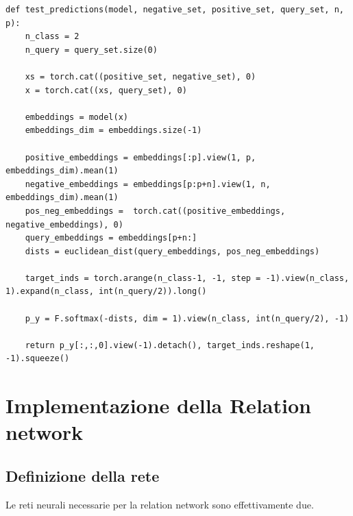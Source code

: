 \documentclass[12pt,a4paper,titlepage]{article}
\begin{document}
\begin{lstlisting}[language=iPython,firstnumber=11, caption=Funzione \texttt{test\_prediction}, label=test_predictions,captionpos=b]
def test_predictions(model, negative_set, positive_set, query_set, n, p):
    n_class = 2
    n_query = query_set.size(0)
    
    xs = torch.cat((positive_set, negative_set), 0)   
    x = torch.cat((xs, query_set), 0)
    
    embeddings = model(x)
    embeddings_dim = embeddings.size(-1)
    
    positive_embeddings = embeddings[:p].view(1, p, embeddings_dim).mean(1)    
    negative_embeddings = embeddings[p:p+n].view(1, n, embeddings_dim).mean(1)     
    pos_neg_embeddings =  torch.cat((positive_embeddings, negative_embeddings), 0)
    query_embeddings = embeddings[p+n:]
    dists = euclidean_dist(query_embeddings, pos_neg_embeddings)

    target_inds = torch.arange(n_class-1, -1, step = -1).view(n_class, 1).expand(n_class, int(n_query/2)).long()

    p_y = F.softmax(-dists, dim = 1).view(n_class, int(n_query/2), -1)

    return p_y[:,:,0].view(-1).detach(), target_inds.reshape(1, -1).squeeze()
\end{lstlisting}
\clearpage


\section{Implementazione della Relation network}
\label{sec:implementazione_relation}
\subsection{Definizione della rete}
Le reti neurali necessarie per la relation network sono effettivamente due.
\end{document}
